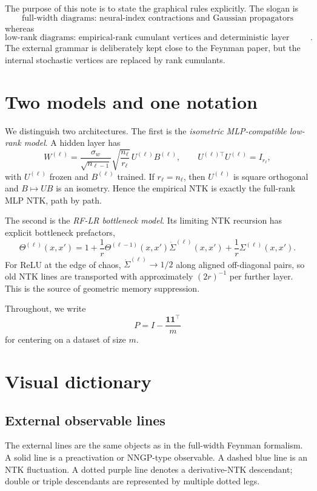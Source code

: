 \documentclass[11pt]{article}
\newcommand{\one}{\mathbf 1}
\begin{document}
The purpose of this note is to state the graphical rules explicitly.  The slogan is
\[
\boxed{\text{full-width diagrams: neural-index contractions and Gaussian propagators}}
\]
whereas
\[
\boxed{\text{low-rank diagrams: empirical-rank cumulant vertices and deterministic layer derivatives}.}
\]
The external grammar is deliberately kept close to the Feynman paper, but the internal stochastic vertices are replaced by rank cumulants.

\section{Two models and one notation}

We distinguish two architectures.  The first is the \emph{isometric MLP-compatible low-rank model}.  A hidden layer has
\begin{equation}
W^{(\ell)}=\frac{\sigma_w}{\sqrt{n_{\ell-1}}}\sqrt{\frac{n_\ell}{r_\ell}}\,U^{(\ell)}B^{(\ell)},
\qquad U^{(\ell)\top}U^{(\ell)}=I_{r_\ell},
\label{eq:isometric}
\end{equation}
with $U^{(\ell)}$ frozen and $B^{(\ell)}$ trained.  If $r_\ell=n_\ell$, then $U^{(\ell)}$ is square orthogonal and $B\mapsto UB$ is an isometry.  Hence the empirical NTK is exactly the full-rank MLP NTK, path by path.

The second is the \emph{RF-LR bottleneck model}.  Its limiting NTK recursion has explicit bottleneck prefactors,
\begin{equation}
\Theta^{(\ell)}(x,x')=1+\frac1r\Theta^{(\ell-1)}(x,x')\dot\Sigma^{(\ell)}(x,x')+\frac1r\Sigma^{(\ell)}(x,x').
\label{eq:rflr-rec}
\end{equation}
For ReLU at the edge of chaos, $\dot\Sigma^{(\ell)}\to 1/2$ along aligned off-diagonal pairs, so old NTK lines are transported with approximately $(2r)^{-1}$ per further layer.  This is the source of geometric memory suppression.

Throughout, we write
\[
P=I-\frac{\one\one^\top}{m}
\]
for centering on a dataset of size $m$.

\section{Visual dictionary}

\subsection{External observable lines}

The external lines are the same objects as in the full-width Feynman formalism.  A solid line is a preactivation or NNGP-type observable.  A dashed blue line is an NTK fluctuation.  A dotted purple line denotes a derivative-NTK descendant; double or triple descendants are represented by multiple dotted legs.
\end{document}
